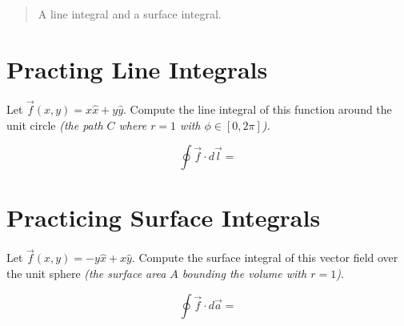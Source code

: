 \documentclass[10pt]{article}
\begin{document}
\maketitle

\begin{abstract}
A line integral and a surface integral.
\end{abstract}
\noindent

\section{Practing Line Integrals}

Let $\vec{f}(x,y) = x\hat{x} + y\hat{y}$.  Compute the line integral of this function around the unit circle \textit{(the path $C$ where $r = 1$ with $\phi \in [0,2\pi]$).}

\begin{equation}
\oint \vec{f} \cdot d\vec{l} = 
\end{equation}

\vspace{3cm}

\section{Practicing Surface Integrals}

Let $\vec{f}(x,y) = -y \hat{x} + x\hat{y}$.  Compute the surface integral of this vector field over the unit sphere \textit{(the surface area $A$ bounding the volume with $r = 1$)}.

\begin{equation}
\oint \vec{f} \cdot d\vec{a} = 
\end{equation}
\end{document}
